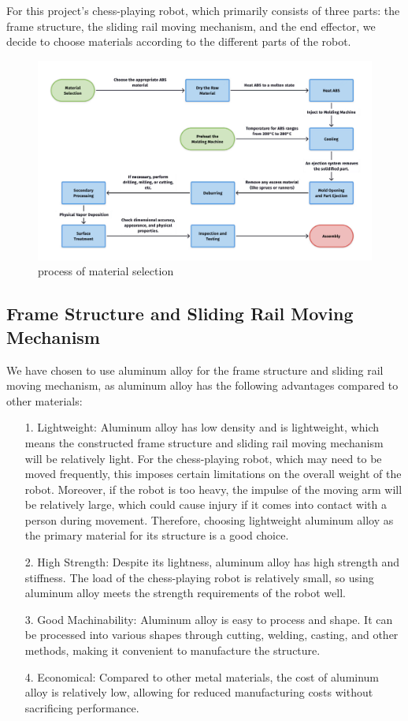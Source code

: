 \documentclass[10pt, a4paper, twocolumn]{article}
\begin{document}
For this project's chess-playing robot, which primarily consists of three parts: the frame structure, the sliding rail moving mechanism, and the end effector, we decide to choose materials according to the different parts of the robot.

\begin{figure}
    \centering
    \includegraphics[width=\linewidth]{material selection.jpg}
    \caption{process of material selection}
    \label{fig:process of material selection}
\end{figure}

\subsection{Frame Structure and Sliding Rail Moving Mechanism}
We have chosen to use aluminum alloy for the frame structure and sliding rail moving mechanism, as aluminum alloy has the following advantages compared to other materials:
\begin{itemize}
    \item [1.] Lightweight: Aluminum alloy has low density and is lightweight, which means the constructed frame structure and sliding rail moving mechanism will be relatively light. For the chess-playing robot, which may need to be moved frequently, this imposes certain limitations on the overall weight of the robot. Moreover, if the robot is too heavy, the impulse of the moving arm will be relatively large, which could cause injury if it comes into contact with a person during movement. Therefore, choosing lightweight aluminum alloy as the primary material for its structure is a good choice.
    \item [2.] High Strength: Despite its lightness, aluminum alloy has high strength and stiffness. The load of the chess-playing robot is relatively small, so using aluminum alloy meets the strength requirements of the robot well.
    \item [3.] Good Machinability: Aluminum alloy is easy to process and shape. It can be processed into various shapes through cutting, welding, casting, and other methods, making it convenient to manufacture the structure.
    \item [4.] Economical: Compared to other metal materials, the cost of aluminum alloy is relatively low, allowing for reduced manufacturing costs without sacrificing performance.
\end{itemize}
\end{document}
